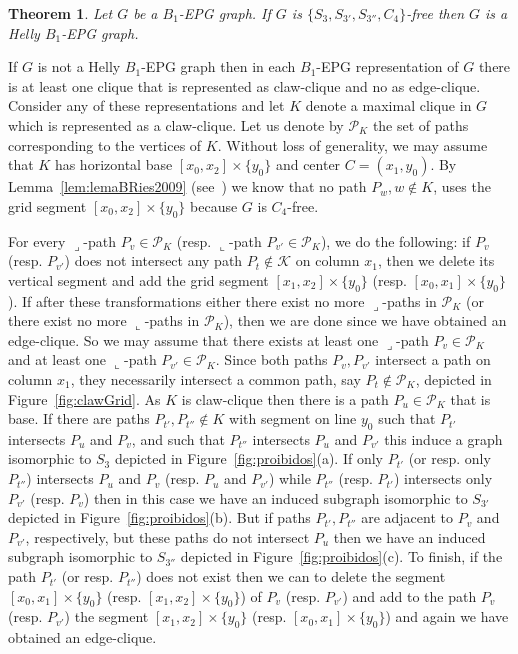 \documentclass[9pt]{entcs}
\newtheorem{teo}{Theorem}[section]
\begin{document}
\begin{teo}
\label{lem:chordalDiamondFree}
Let $G$ be a $B_1$-EPG graph. If $G$ is  $\{S_{3}, S_{3'}, S_{3''}, C_{4}\}$-free then $G$  is a Helly $B_1$-EPG graph.
\end{teo}

\begin{pf}
If $G$ is not a Helly $B_1$-EPG graph then in each $B_1$-EPG representation of $G$ there is at least one clique that is represented as claw-clique and no as edge-clique. Consider any of these  representations and let $K$ denote a maximal clique in $G$ which is represented as a claw-clique. Let us denote by  $\mathcal{P}_K$ the set of paths corresponding to the vertices of $K$. 
Without loss of generality, we may assume that $K$  has horizontal base $[x_0, x_2]\times\{y_0\}$ and center $C = (x_1, y_0)$. By Lemma~\ref{lem:lemaBRies2009} (see~\cite{ries2009}) we know that no path $P_w, w\notin K$, uses the grid segment $[x_0, x_2]\times\{y_0\}$ because $G$ is $C_4$-free.

 For every ${\displaystyle \lrcorner}$-path $P_v \in \mathcal{P}_K$ (resp. ${\displaystyle \llcorner}$-path $P_{v'} \in \mathcal{P}_K$), we do the following: if $P_v$ (resp. $P_{v'}$) does not intersect any path $P_t \notin \mathcal{K}$ on column $x_1$, then we delete its vertical segment and add the grid segment $[x_1, x_2]\times\{y_0\}$ (resp. $[x_0, x_1]\times\{y_0\}$). If after these transformations either there exist no more ${\displaystyle \lrcorner}$-paths in $\mathcal{P}_K$ (or there exist no more ${\displaystyle \llcorner}$-paths in $\mathcal{P}_K$), then we are done since we have obtained an edge-clique. So we may assume that there exists at least one ${\displaystyle \lrcorner}$-path $P_v \in \mathcal{P}_K$ and at least one ${\displaystyle \llcorner}$-path $P_{v'} \in \mathcal{P}_K$. Since both paths $P_v, P_{v'}$ intersect a path on column $x_1$, they necessarily intersect a common path, say $P_t \notin \mathcal{P}_K$, depicted in Figure~\ref{fig:clawGrid}. As $K$ is claw-clique then there is a path $P_u \in \mathcal{P}_K$ that is base. If there are paths $P_{t'}, P_{t''} \notin K$ with segment on line $y_0$ such that $P_{t'}$  intersects $P_{u}$ and $P_{v}$, and such that $P_{t''}$ intersects $P_{u}$ and $P_{v'}$ this induce a graph isomorphic to $S_3$ depicted in Figure~\ref{fig:proibidos}(a). If only $P_{t'}$ (or resp. only $P_{t''}$) intersects $P_{u}$ and $P_{v}$ (resp. $P_{u}$ and $P_{v'}$) while $P_{t''}$ (resp. $P_{t'}$) intersects only $P_{v'}$ (resp. $P_{v}$) then in this case we have an induced subgraph isomorphic to $S_{3'}$ depicted in Figure~\ref{fig:proibidos}(b). But if paths $P_{t'}, P_{t''}$ are adjacent to $P_v$ and $P_{v'}$, respectively, but these paths do not intersect $P_u$ then we have an induced subgraph isomorphic to $S_{3''}$ depicted in Figure~\ref{fig:proibidos}(c). To finish, if the path $P_{t'}$ (or resp. $P_{t''}$) does not exist then we can to delete the segment $[x_0,x_1]\times \{y_0\}$ (resp. $[x_1,x_2]\times \{y_0\}$) of $P_v$ (resp. $P_{v'}$) and add to the path $P_v$ (resp. $P_{v'}$) the segment $[x_1,x_2]\times \{y_0\}$ (resp. $[x_0,x_1]\times \{y_0\}$) and again we have obtained an edge-clique.
 

\end{pf}
\end{document}
